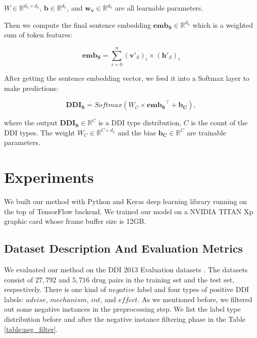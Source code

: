 \documentclass[conference]{IEEEtran}
\begin{document}
\noindent
$W \in \mathbb{R}^{d_h \times d_h}$, $\bm{b} \in \mathbb{R}^{d_h}$, and $\bm{w_v} \in \mathbb{R}^{d_h}$ are all learnable parameters.

Then we compute the final sentence embedding $\bm{emb_{\text{S}}} \in \mathbb{R}^{d_h}$ which is a weighted sum of token features:

\begin{equation}
\bm{emb_{\text{S}}} = \sum_{i=0}^{n} {(\bm{v'}_S)_i \times (\bm{h'}_S)_i}
\end{equation}

After getting the sentence embedding vector, we feed it into a Softmax layer to make predictions:

\begin{equation}
\bm{DDI_S} = Softmax \left ( W_C \times \bm{emb_{\text{S}}}^{\top} + \bm{b_C} \right ),
\end{equation}

where the output $\bm{DDI_S} \in \mathbb{R}^C$ is a DDI type distribution, $C$ is the count of 
the DDI types.
The weight $W_C \in \mathbb{R}^{C \times d_h}$ and the bias $\bm{b_C} \in \mathbb{R}^C$ are trainable parameters.

\section{Experiments}
\label{sec:experiments}

We built our method with Python and Keras deep learning library \cite{chollet_keras_2015} running on the top of 
TensorFlow \cite{girija_tensorflow:_2016} backend.
We trained our model on a NVIDIA TITAN Xp graphic card whose frame buffer size is 12GB.

\subsection{Dataset Description And Evaluation Metrics}

We evaluated our method on the DDI 2013 Evaluation datasets \cite{segura-bedmar_semeval-2013_2013}.
The datasets consist of $27, 792$ and $5, 716$ drug pairs in the training set and the test set, respectively.
There is one kind of $negative$ label and four types of positive DDI labels: $advise$, $mechanism$, $int$, and $effect$. 
As we mentioned before, we filtered out some negative instances in the preprocessing step.
We list the label type distribution before and after the negative instance filtering phase in the Table \ref{table:neg_filter}.
\end{document}
